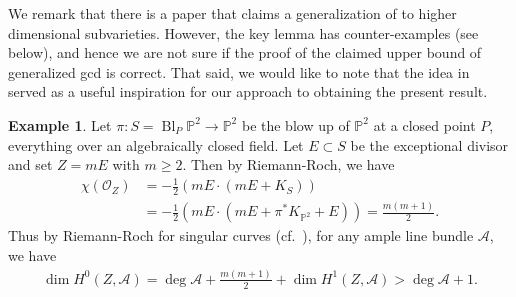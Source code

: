 \documentclass[12pt]{amsart}
\theoremstyle{plain}
\theoremstyle{definition}
\newtheorem{example}[theorem]{Example}
\numberwithin{equation}{section}
\def\P{{\mathbb P}}
\def\O{{ \mathcal{O}}}
\DeclareMathOperator{\Bl}{Bl}
\begin{document}
We remark that there is a paper \cite{BARRIOS_2025}
that claims a generalization of \cite[Theorem 3.1]{GP24} to higher dimensional subvarieties.
However, the key lemma \cite[Lemma 2.1]{BARRIOS_2025} has counter-examples (see below), and hence
we are not sure if the proof of the claimed upper bound of generalized gcd \cite[Theorem 1.2]{BARRIOS_2025}
is correct.
That said, we would like to note that the idea in \cite{BARRIOS_2025} served as a useful inspiration for our approach to obtaining the present result.

\begin{example}
Let $\pi \colon S = \Bl_{P}\P^{2} \longrightarrow \P^{2}$
be the blow up of $\P^{2}$ at a closed point $P$, everything over an algebraically closed field.
Let $E \subset S$ be the exceptional divisor and set $Z = mE$ with $m \geq 2$.
Then by Riemann-Roch, we have
\begin{align}
\chi(\O_{Z}) &= - \frac{1}{2} (mE \cdot (mE + K_{S})) \\
&= - \frac{1}{2} (mE \cdot (mE + \pi^{*}K_{\P^{2}} +E)) = \frac{m(m+1)}{2}.
\end{align}
Thus by Riemann-Roch for singular curves (cf.\ \cite[Theorem 3.17]{Liu}), for any ample line bundle $ \mathcal{A}$, we have
\begin{align}
\dim H^{0}(Z, \mathcal{A}) = \deg \mathcal{A} + \frac{m(m+1)}{2} + \dim H^{1}(Z, \mathcal{A}) > \deg \mathcal{A} + 1.
\end{align}
\end{example}
\end{document}
